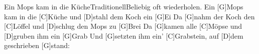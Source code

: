 \documentclass[../main.tex]{subfiles}
\begin{document}
\begin{song}{Ein Mops kam in die Küche}{Traditionell}{Beliebig oft wiederholen.}
Ein [G]Mops kam in die [C]Küche und [D]stahl dem Koch ein [G]Ei
Da [G]nahm der Koch den [C]Löffel und [D]schlug den Mops zu [G]Brei
Da [G]kamen alle [C]Möpse und [D]gruben ihm ein [G]Grab
Und [G]setzten ihm ein' [C]Grabstein, auf [D]dem geschrieben [G]stand:
\end{song}
\end{document}
